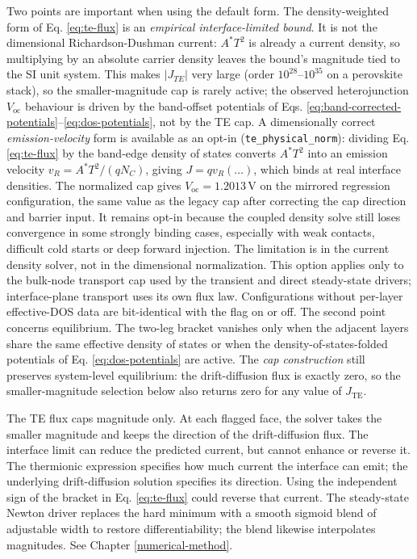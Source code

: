 \documentclass[
  11pt,
  american,
]{report}
\begin{document}
Two points are important when using the default form. The
density-weighted form of Eq. \ref{eq:te-flux} is an \emph{empirical
interface-limited bound}. It is not the dimensional Richardson-Dushman
current: \(A^{*}T^{2}\) is already a current density, so multiplying by
an absolute carrier density leaves the bound's magnitude tied to the SI
unit system. This makes \(|J_{TE}|\) very large (order
\(10^{28}\)--\(10^{35}\) on a perovskite stack), so the
smaller-magnitude cap is rarely active; the observed heterojunction
\(V_\mathrm{oc}\) behaviour is driven by the band-offset potentials of
Eqs. \ref{eq:band-corrected-potentials}--\ref{eq:dos-potentials}, not by
the TE cap. A dimensionally correct \emph{emission-velocity} form is
available as an opt-in (\texttt{te\_physical\_norm}): dividing Eq.
\ref{eq:te-flux} by the band-edge density of states converts
\(A^{*}T^{2}\) into an emission velocity \(v_R = A^{*}T^{2}/(qN_C)\),
giving \(J = qv_R(\dots)\), which binds at real interface densities. The
normalized cap gives \(V_\mathrm{oc}=1.2013\,\mathrm{V}\) on the
mirrored regression configuration, the same value as the legacy cap
after correcting the cap direction and barrier input. It remains opt-in
because the coupled density solve still loses convergence in some
strongly binding cases, especially with weak contacts, difficult cold
starts or deep forward injection. The limitation is in the current
density solver, not in the dimensional normalization. This option
applies only to the bulk-node transport cap used by the transient and
direct steady-state drivers; interface-plane transport uses its own flux
law. Configurations without per-layer effective-DOS data are
bit-identical with the flag on or off. The second point concerns
equilibrium. The two-leg bracket vanishes only when the adjacent layers
share the same effective density of states or when the
density-of-states-folded potentials of Eq. \ref{eq:dos-potentials} are
active. The \emph{cap construction} still preserves system-level
equilibrium: the drift-diffusion flux is exactly zero, so the
smaller-magnitude selection below also returns zero for any value of
\(J_{\mathrm{TE}}\).

The TE flux caps magnitude only. At each flagged face, the solver takes
the smaller magnitude and keeps the direction of the drift-diffusion
flux. The interface limit can reduce the predicted current, but cannot
enhance or reverse it. The thermionic expression specifies how much
current the interface can emit; the underlying drift-diffusion solution
specifies its direction. Using the independent sign of the bracket in
Eq. \ref{eq:te-flux} could reverse that current. The steady-state Newton
driver replaces the hard minimum with a smooth sigmoid blend of
adjustable width to restore differentiability; the blend likewise
interpolates magnitudes. See Chapter \ref{numerical-method}.
\end{document}
